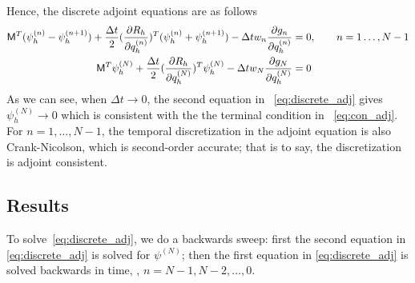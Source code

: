 \documentclass[a4paper]{article}
\begin{document}
Hence, the discrete adjoint equations are as follows
\begin{equation} \label{eq:discrete_adj}
\begin{aligned}
\mathsf{M}^T(\psi_h^{(n)} -  \psi_h^{(n+1)}) + \frac{\Delta t}{2}(\frac{\partial {R_h}}{\partial{q_h^{(n)}}})^T(\psi_h^{(n)}+\psi_h^{(n+1)}) - \Delta t w_n \frac{\partial {g_n}}{\partial{q_h^{(n)}}} &= 0, \quad\quad n=1\dots,N-1 \\
 \mathsf{M}^T\psi^{(N)}_h + \frac{\Delta t}{2}(\frac{\partial {R_h}}{\partial{q^{(N)}_h}})^T\psi^{(N)}_h -\Delta t w_N \frac{\partial {g_N}}{\partial{q^{(N)}_h}} &= 0
\end{aligned}
\end{equation}
As we can see, when $\Delta t \to 0$, the second equation in ~\eqref{eq:discrete_adj} gives $\psi^{(N)}_h \to 0$ which is consistent with the the terminal condition in ~\eqref{eq:con_adj}. For $n=1,\dots, N-1$, the temporal discretization in the adjoint equation is also Crank-Nicolson, which is second-order accurate; that is to say, the discretization is adjoint consistent.

\subsection{Results}
To solve~\eqref{eq:discrete_adj}, we do a backwards sweep: first the second equation in \eqref{eq:discrete_adj} is solved for $\psi^{(N)}$; then the first equation in \eqref{eq:discrete_adj} is solved backwards in time, \ie, $n=N-1, N-2, \dots, 0$.
\end{document}
